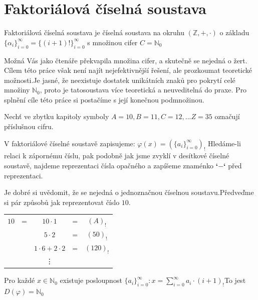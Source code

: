 \documentclass[czech,bachelor,dept470,male]{diploma}
\newcommand{\poslalpha}{\{\alpha_i\}_{i=0}^{\infty}}
\newcommand{\posla}{\{a_i\}_{i=0}^{\infty}}
\begin{document}
\section{Faktoriálová číselná soustava}
\begin{definition}
	Faktoriálová číselná soustava je číselná soustava na okruhu $(\mathbb{Z},+,\cdot)$ o základu $\poslalpha = \{(i+1)!\}_{i=0}^\infty$ s množinou cifer $C=\mathbb{N}_0$
\end{definition}
\begin{remark}
	Možná Vás jako čtenáře překvapila množina cifer, a skutečně se nejedná o žert. Cílem této práce však není najít nejefektivnější řešení, ale prozkoumat teoretické možnosti.\newline Je jasné, že neexistuje dostatek unikátních znaků pro pokrytí celé množiny $\mathbb{N}_0$, proto je tato\newline soustava více teoretická a neuveditelná do praxe. Pro splnění cíle této práce si postačíme s její konečnou podmnožinou.
\end{remark}
\begin{agreement}
	Nechť ve zbytku kapitoly symboly $A = 10, B = 11, C = 12, ... Z = 35$ označují příslušnou cifru.
\end{agreement}
\begin{agreement}
	V faktoriálové číselné soustavě zapisujeme:
	$\varphi(x) = (\posla)_!$\newline
	Hledáme-li relaci k zápornému číslu, pak podobně jak jsme zvyklí v desítkové číselné soustavě, najdeme reprezentaci čísla opačného a zapíšeme znaménko \textbf{`$-$`} před reprezentaci.
\end{agreement}
\begin{remark}
	Je dobré si uvědomit, že se nejedná o jednoznačnou číselnou soustavu.\newline Předveďme si pár způsobů jak reprezentovat číslo $10$.
	\begin{center}
		\begin{tabular}{c c c c c}
			$10$ & = & $10\cdot1$        & = & $(A)_!$   \\
			     &   & $5\cdot2$         & = & $(50)_!$  \\
			     &   & $1\cdot6+2\cdot2$ & = & $(120)_!$ \\
			     &   & \vdots            &   &
		\end{tabular}
	\end{center}
\end{remark}
\begin{theorem}
	Pro každé $x \in \mathbb{N}_0$ existuje posloupnost $\posla: x=
		\sum_{i=0}^{\infty}a_i\cdot (i+1)_!$\newline To jest $D(\varphi)=\mathbb{N}_0$
\end{theorem}
\end{document}
